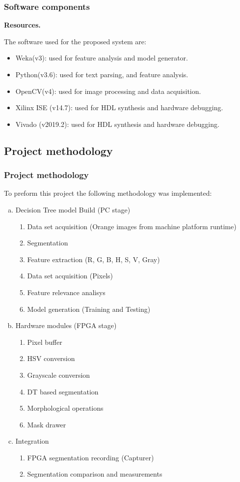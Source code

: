 \documentclass[
serif,
compress,
xcolor=table,
dvipsnames,
]{beamer}
\begin{document}
\begin{frame}
\frametitle{Software components}
\textbf{Resources.}

The software used for the proposed system are:
\begin{itemize}
\item Weka(v3): used for feature analysis and model generator.
\item Python(v3.6): used for text parsing, and feature analysis.
\item OpenCV(v4): used for image processing and data acquisition.
\item Xilinx ISE (v14.7): used for HDL synthesis and hardware debugging. 
\item Vivado (v2019.2): used for HDL synthesis and hardware debugging. 
\end{itemize}

\end{frame}


\subsection{Project methodology}
\begin{frame}
\frametitle{Project methodology}
To preform this project the following methodology was implemented:

\begin{enumerate} [a)]
 \item Decision Tree model Build (PC stage)
 \begin{enumerate}
 \item Data set acquisition (Orange images from machine platform runtime)
 \item Segmentation
  \item Feature extraction (R, G, B, H, S, V, Gray)
  \item Data set acquisition (Pixels)
  \item Feature relevance analisys
  \item Model generation (Training and Testing)
 \end{enumerate}

 \item Hardware modules (FPGA stage)
 \begin{enumerate}
  \item Pixel buffer
  \item HSV conversion
  \item Grayscale conversion
  \item DT based segmentation
  \item Morphological operations
  \item Mask drawer
 \end{enumerate}
 
 \item Integration
 \begin{enumerate}
  \item FPGA segmentation recording (Capturer)
  \item Segmentation comparison and measurements
 \end{enumerate}

\end{enumerate}
\end{frame}
\end{document}
